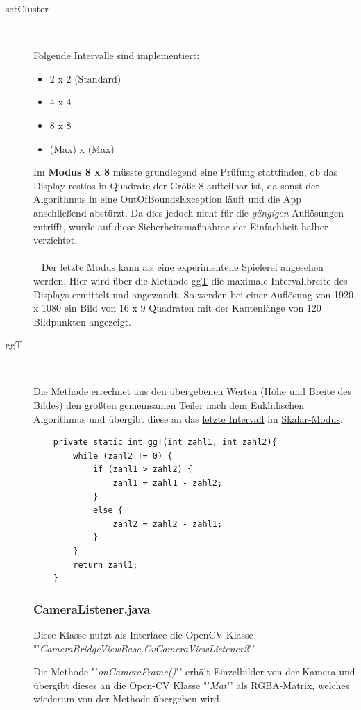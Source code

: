 \begin{description}
\item[setCluster]~\par
\label{intervall}
Folgende Intervalle sind implementiert:
\begin{itemize}
\item 2 x 2 (Standard)
\item 4 x 4 
\item 8 x 8
\item (Max) x (Max)
\end{itemize}
Im \textbf{Modus 8 x 8} müsste grundlegend eine Prüfung stattfinden, ob das Display restlos in Quadrate der Größe 8 aufteilbar ist, da sonst der Algorithmus in eine OutOfBoundsException läuft und die App anschließend abstürzt. Da dies jedoch nicht für die \textit{gängigen} Auflösungen zutrifft, wurde auf diese Sicherheitsmaßnahme der Einfachheit halber verzichtet. \\
\\\
\label{max}
Der letzte Modus kann als eine experimentelle Spielerei angesehen werden. Hier wird über die Methode \hyperref[ggt]{ggT} die maximale Intervallbreite des Displays ermittelt und angewandt. So werden bei einer Auflösung von 1920 x 1080 ein Bild von 16 x 9 Quadraten mit der Kantenlänge von 120 Bildpunkten angezeigt.\\



\item[ggT]~\par
\label{ggt}
Die Methode errechnet aus den übergebenen Werten (Höhe und Breite des Bildes) den größten gemeinsamen Teiler nach dem Euklidischen Algorithmus und übergibt diese an das \hyperref[max]{letzte Intervall} im \hyperref[quantimode1]{Skalar-Modus}.
\begin{lstlisting}
    private static int ggT(int zahl1, int zahl2){
        while (zahl2 != 0) {
            if (zahl1 > zahl2) {
                zahl1 = zahl1 - zahl2;
            } 
            else {
                zahl2 = zahl2 - zahl1;
            }
        }
        return zahl1;
    }
\end{lstlisting}

\subsubsection{CameraListener.java}
\label{CameraListener}
Diese Klasse nutzt als Interface die OpenCV-Klasse "'\textit{CameraBridgeViewBase.CvCameraViewListener2}"' 

Die Methode "'\textit{onCameraFrame()}"' erhält Einzelbilder von der Kamera und übergibt dieses an die Open-CV Klasse "'\textit{Mat}"' als RGBA-Matrix, welches wiederum von der Methode übergeben wird.


\end{description}
